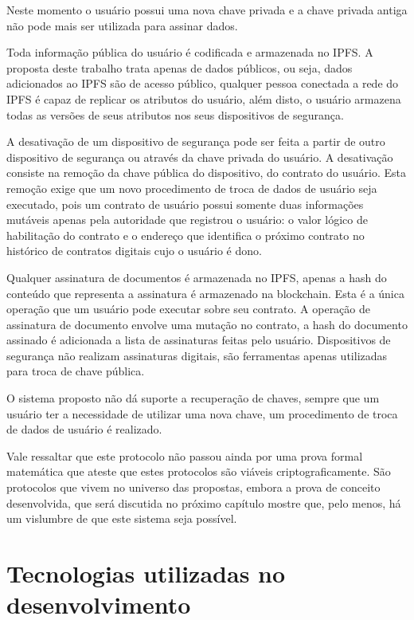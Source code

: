 \documentclass[tcc,capa]{texufpel}
\begin{document}
        Neste momento o usuário possui uma nova chave privada e a chave privada antiga não pode mais ser utilizada para assinar dados.
        
        Toda informação pública do usuário é codificada e armazenada no IPFS. A proposta deste trabalho trata apenas de dados públicos, ou seja, dados adicionados ao IPFS são de acesso público, qualquer pessoa conectada a rede do IPFS é capaz de replicar os atributos do usuário, além disto, o usuário armazena todas as versões de seus atributos nos seus dispositivos de segurança.
        
        A desativação de um dispositivo de segurança pode ser feita a partir de outro dispositivo de segurança ou através da chave privada do usuário. A desativação consiste na remoção da chave pública do dispositivo, do contrato do usuário. Esta remoção exige que um novo procedimento de troca de dados de usuário seja executado, pois um contrato de usuário possui somente duas informações mutáveis apenas pela autoridade que registrou o usuário: o valor lógico de habilitação do contrato e o endereço que identifica o próximo contrato no histórico de contratos digitais cujo o usuário é dono.
        
        Qualquer assinatura de documentos é armazenada no IPFS, apenas a hash do conteúdo que representa a assinatura é armazenado na blockchain. Esta é a única operação que um usuário pode executar sobre seu contrato. A operação de assinatura de documento envolve uma mutação no contrato, a hash do documento assinado é adicionada a lista de assinaturas feitas pelo usuário. Dispositivos de segurança não realizam assinaturas digitais, são ferramentas apenas utilizadas para troca de chave pública.
        
        O sistema proposto não dá suporte a recuperação de chaves, sempre que um usuário ter a necessidade de utilizar uma nova chave, um procedimento de troca de dados de usuário é realizado.
        
        Vale ressaltar que este protocolo não passou ainda por uma prova formal matemática que ateste que estes protocolos são viáveis criptograficamente. São protocolos que vivem no universo das propostas, embora a prova de conceito desenvolvida, que será discutida no próximo capítulo mostre que, pelo menos, há um vislumbre de que este sistema seja possível.
        
        
\chapter{Tecnologias utilizadas no desenvolvimento}\label{chap:desenvolvimento}
    
\end{document}
